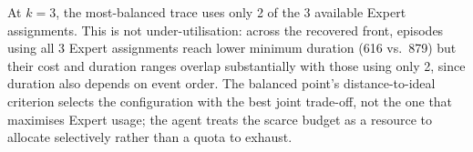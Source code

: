 At $k=3$, the most-balanced trace uses only 2 of the 3 available
Expert assignments. This is not under-utilisation: across the
recovered front, episodes using all 3 Expert assignments reach lower
minimum duration (616 vs.\ 879) but their cost and duration ranges
overlap substantially with those using only 2, since duration also
depends on event order. The balanced point's distance-to-ideal
criterion selects the configuration with the best joint trade-off, not
the one that maximises Expert usage; the agent treats the scarce
budget as a resource to allocate selectively rather than a quota to
exhaust.
